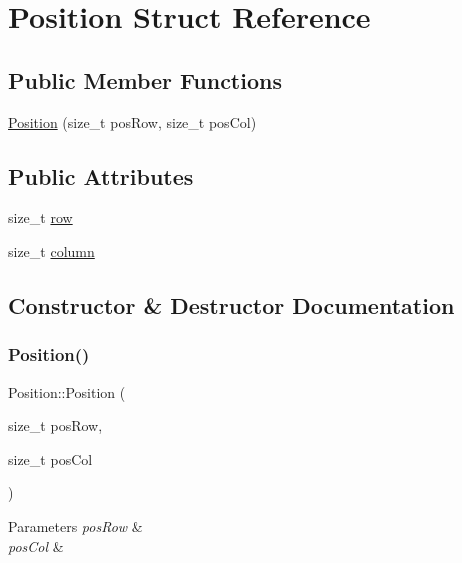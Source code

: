 \hypertarget{struct_position}{}\section{Position Struct Reference}
\label{struct_position}
\subsection*{Public Member Functions}
\begin{DoxyCompactItemize}
\item 
\mbox{\hyperlink{struct_position_ac30ff0c554df4e53f02b79b067ac368c}{Position}} (size\+\_\+t pos\+Row, size\+\_\+t pos\+Col)
\end{DoxyCompactItemize}
\subsection*{Public Attributes}
\begin{DoxyCompactItemize}
\item 
size\+\_\+t \mbox{\hyperlink{struct_position_a55d3db7ca0f004461b890a5340a0cd24}{row}}
\item 
size\+\_\+t \mbox{\hyperlink{struct_position_abac43d1772ad2cf9447b134240e88d27}{column}}
\end{DoxyCompactItemize}


\subsection{Constructor \& Destructor Documentation}
\mbox{\label{struct_position_ac30ff0c554df4e53f02b79b067ac368c}} 
\subsubsection{\texorpdfstring{Position()}{Position()}}
{\footnotesize\ttfamily Position\+::\+Position (\begin{DoxyParamCaption}\item[{size\+\_\+t}]{pos\+Row,  }\item[{size\+\_\+t}]{pos\+Col }\end{DoxyParamCaption})\hspace{0.3cm}{\ttfamily [inline]}}


\begin{DoxyParams}{Parameters}
{\em pos\+Row} & \\
\hline
{\em pos\+Col} & \\
\hline
\end{DoxyParams}


